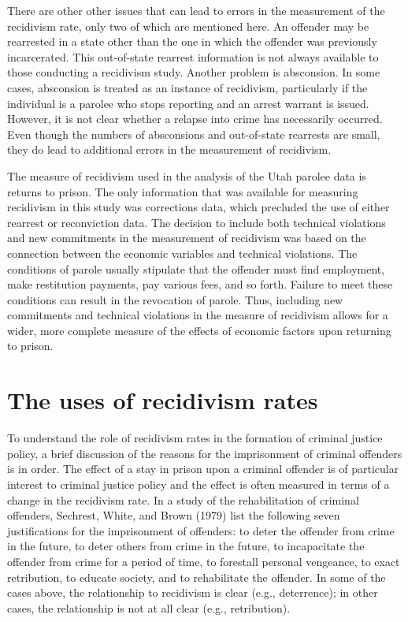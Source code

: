 There are other other issues that can lead to errors in the measurement of the recidivism rate, only two of which are mentioned here.  An offender may be rearrested in a state other than the one in which the offender was previously incarcerated.  This out-of-state rearrest information is not always available to those conducting a recidivism study.  Another problem is absconsion.  In some cases, absconsion is treated as an instance of recidivism, particularly if the individual is a parolee who stops reporting and an arrest warrant is issued.  However, it is not clear whether a relapse into crime has necessarily occurred.  Even though the numbers of absconsions and out-of-state rearrests are small, they do lead to additional errors in the measurement of recidivism.

The measure of recidivism used in the analysis of the Utah parolee data is returns to prison.  The only information that was available for measuring recidivism in this study was corrections data, which precluded the use of either rearrest or reconviction data.  The decision to include both technical violations and new commitments in the measurement of recidivism was based on the connection between the economic variables and technical violations.  The conditions of parole usually stipulate that the offender must find employment, make restitution payments, pay various fees, and so forth.  Failure to meet these conditions can result in the revocation of parole.  Thus, including new commitments and technical violations in the measure of recidivism allows for a wider, more complete measure of the effects of economic factors upon returning to prison.


\section{The uses of recidivism rates}

To understand the role of recidivism rates in the formation of criminal justice policy, a brief discussion of the reasons for the imprisonment of criminal offenders is in order.  The effect of a stay in prison upon a criminal offender is of particular interest to criminal justice policy and the effect is often measured in terms of a change in the recidivism rate.  In a study of the rehabilitation of criminal offenders, Sechrest, White, and Brown (1979) list the following seven justifications for the imprisonment of offenders:  to deter the offender from crime in the future, to deter others from crime in the future, to incapacitate the offender from crime for a period of time, to forestall personal vengeance, to exact retribution, to educate society, and to rehabilitate the offender.  In some of the cases above, the relationship to recidivism is clear (e.g., deterrence); in other cases, the relationship is not at all clear (e.g., retribution).

